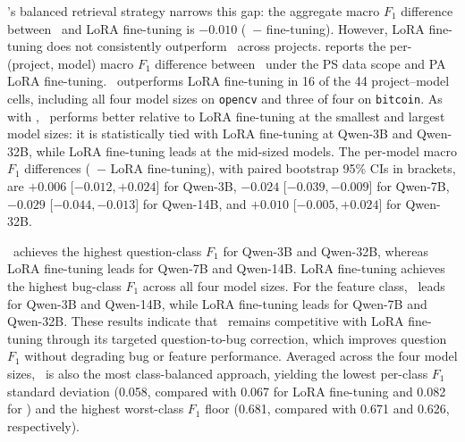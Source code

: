 \bragtag's balanced retrieval strategy narrows this gap: the aggregate macro $F_1$ difference between \bragtag\ and LoRA fine-tuning is $-0.010$ (\bragtag\ $-$ fine-tuning). However, LoRA fine-tuning does not consistently outperform \bragtag\ across projects.  reports the per-(project, model) macro $F_1$ difference between \bragtag\ under the PS data scope and PA LoRA fine-tuning. \bragtag\ outperforms LoRA fine-tuning in 16 of the 44 project--model cells, including all four model sizes on \texttt{opencv} and three of four on \texttt{bitcoin}. As with \ragtag, \bragtag\ performs better relative to LoRA fine-tuning at the smallest and largest model sizes: it is statistically tied with LoRA fine-tuning at Qwen-3B and Qwen-32B, while LoRA fine-tuning leads at the mid-sized models. The per-model macro $F_1$ differences (\bragtag\ $-$ LoRA fine-tuning), with paired bootstrap 95\% CIs in brackets, are $+0.006$ [$-0.012, +0.024$] for Qwen-3B, $-0.024$ [$-0.039, -0.009$] for Qwen-7B, $-0.029$ [$-0.044, -0.013$] for Qwen-14B, and $+0.010$ [$-0.005, +0.024$] for Qwen-32B.

\bragtag\ achieves the highest question-class $F_1$ for Qwen-3B and Qwen-32B, whereas LoRA fine-tuning leads for Qwen-7B and Qwen-14B. LoRA fine-tuning achieves the highest bug-class $F_1$ across all four model sizes. For the feature class, \bragtag\ leads for Qwen-3B and Qwen-14B, while LoRA fine-tuning leads for Qwen-7B and Qwen-32B. These results indicate that \bragtag\ remains competitive with LoRA fine-tuning through its targeted question-to-bug correction, which improves question $F_1$ without degrading bug or feature performance. Averaged across the four model sizes, \bragtag\ is also the most class-balanced approach, yielding the lowest per-class $F_1$ standard deviation (0.058, compared with 0.067 for LoRA fine-tuning and 0.082 for \ragtag) and the highest worst-class $F_1$ floor (0.681, compared with 0.671 and 0.626, respectively).

